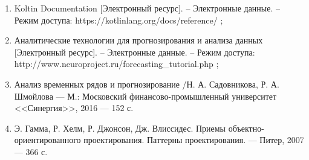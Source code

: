 
\begin{enumerate}
  \item Koltin Documentation [Электронный ресурс]. 
  – Электронные данные. – Режим доступа: https://kotlinlang.org/docs/reference/ ;
  \item Аналитические технологии для прогнозирования и анализа данных [Электронный ресурс]. 
  – Электронные данные. – Режим доступа: \\http://www.neuroproject.ru/forecasting\_tutorial.php ;
  \item Анализ временных рядов и прогнозирование /Н. А. Садовникова, Р. А. Шмойлова 
  --- М.: Московский финансово-промышленный университет 
  <<Синергия>>, 2016 --- 152 с.
  \item Э. Гамма, Р. Хелм, Р. Джонсон, Дж. Влиссидес. Приемы
  объектно-ориентированного проектирования. Паттерны проектирования. --- Питер,
  2007 --- 366 с.
  
\end{enumerate}